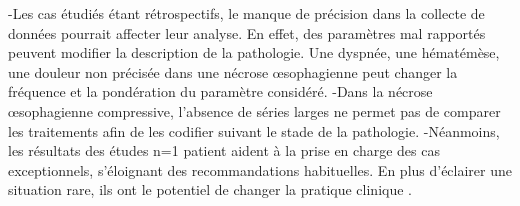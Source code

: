\documentclass[./discussion]{subfiles}
\begin{document}
-Les cas étudiés étant rétrospectifs, le manque de précision dans la collecte de données pourrait affecter leur analyse. En effet, des paramètres mal rapportés peuvent modifier la description de la pathologie. Une dyspnée, une hématémèse, une douleur non précisée dans une nécrose œsophagienne peut changer la fréquence et la pondération du paramètre considéré.
-Dans la nécrose œsophagienne compressive, l’absence de séries larges ne permet pas de comparer les traitements afin de les codifier suivant le stade de la pathologie.
-Néanmoins, les résultats des études n=1 patient aident à la prise en charge des cas exceptionnels, s’éloignant des recommandations habituelles. En plus d’éclairer une situation rare, ils ont le potentiel de changer la pratique clinique \cite{albrecht_case_2005, sperini_case_nodate}.
\end{document}
